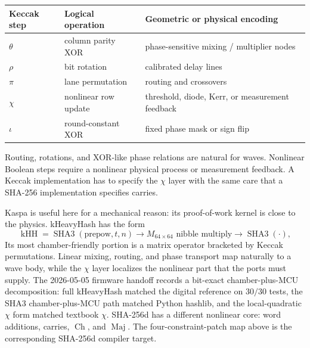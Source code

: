\documentclass[11pt]{article}
\theoremstyle{definition}
\theoremstyle{remark}
\newcommand{\Ch}{\operatorname{Ch}}
\newcommand{\Maj}{\operatorname{Maj}}
\begin{document}
\begin{center}
\begin{minipage}{\linewidth}
\centering
\begin{tabular}{lll}
\toprule
Keccak step & Logical operation & Geometric or physical encoding\\
\midrule
\(\theta\) & column parity XOR & phase-sensitive mixing / multiplier nodes\\
\(\rho\) & bit rotation & calibrated delay lines\\
\(\pi\) & lane permutation & routing and crossovers\\
\(\chi\) & nonlinear row update & threshold, diode, Kerr, or measurement feedback\\
\(\iota\) & round-constant XOR & fixed phase mask or sign flip\\
\bottomrule
\end{tabular}
\label{tab:keccak}
\end{minipage}
\end{center}

Routing, rotations, and XOR-like phase relations are natural for waves.
Nonlinear Boolean steps require a nonlinear physical process or measurement
feedback. A Keccak implementation has to specify the \(\chi\) layer
with the same care that a SHA-256 implementation specifies carries.

Kaspa is useful here for a mechanical reason: its proof-of-work kernel is close
to the physics. kHeavyHash has the form
\[
\operatorname{kHH}
=
\operatorname{SHA3}(\mathrm{prepow},t,n)
\longrightarrow
M_{64\times64}\text{ nibble multiply}
\longrightarrow
\operatorname{SHA3}(\cdot),
\]
Its most chamber-friendly portion is a matrix operator bracketed by Keccak
permutations. Linear mixing, routing, and phase transport map naturally to a
wave body, while the \(\chi\) layer localizes the nonlinear part that the
ports must supply. The 2026-05-05 firmware handoff records a bit-exact
chamber-plus-MCU decomposition: full kHeavyHash matched the digital reference
on \(30/30\) tests, the SHA3 chamber-plus-MCU path matched Python hashlib, and
the local-quadratic \(\chi\) form matched textbook \(\chi\). SHA-256d has a different nonlinear core:
word additions, carries, \(\Ch\), and \(\Maj\). The four-constraint-patch map above is the
corresponding SHA-256d compiler target.

\FloatBarrier
\end{document}

